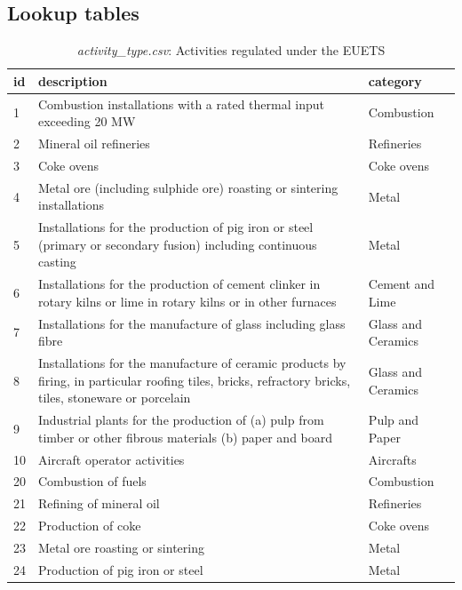 \documentclass[authoryear]{elsarticle}
\begin{document}
\subsection{Lookup tables}\label{app:lookup}
\begin{table}[htbp]\scriptsize
	\caption{\textit{activity\_type.csv}: Activities regulated under the EUETS}\label{tab:activityTypes}
	\centering
	\begin{tabular*}{\textwidth}{@{}@{\extracolsep{\fill}} lp{30.18em}l @{}}	
		\toprule
		\toprule		
		\textbf{id} & \multicolumn{1}{l}{\textbf{description}} & \multicolumn{1}{p{5.135em}}{\textbf{category}} \\
		\midrule
		1     & Combustion installations with a rated thermal input exceeding 20 MW & Combustion \\
		2     & Mineral oil refineries & Refineries \\
		3     & Coke ovens & Coke ovens \\
		4     & Metal ore (including sulphide ore) roasting or sintering installations & Metal \\
		5     & Installations for the production of pig iron or steel (primary or secondary fusion) including continuous casting & Metal \\
		6     & Installations for the production of cement clinker in rotary kilns or lime in rotary kilns or in other furnaces & Cement and Lime \\
		7     & Installations for the manufacture of glass including glass fibre & Glass and Ceramics \\
		8     & Installations for the manufacture of ceramic products by firing, in particular roofing tiles, bricks, refractory bricks, tiles, stoneware or porcelain & Glass and Ceramics \\
		9     & Industrial plants for the production of (a) pulp from timber or other fibrous materials (b) paper and board & Pulp and Paper \\
		10    & Aircraft operator activities & Aircrafts \\
		20    & Combustion of fuels & Combustion \\
		21    & Refining of mineral oil & Refineries \\
		22    & Production of coke & Coke ovens \\
		23    & Metal ore roasting or sintering & Metal \\
		24    & Production of pig iron or steel & Metal \\

\end{tabular*}
\end{table}
\end{document}
